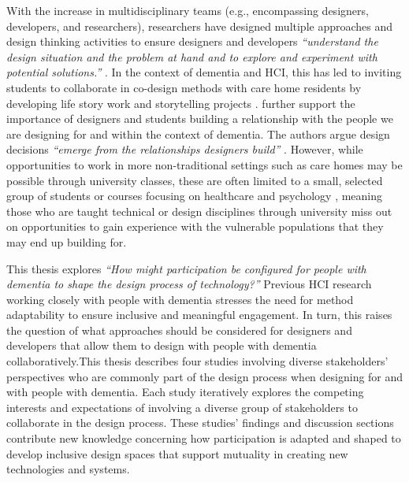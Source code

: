 With the increase in multidisciplinary teams (e.g., encompassing designers, developers, and researchers), researchers have designed multiple approaches and design thinking activities to ensure designers and developers  \textit{``understand the design situation and the problem at hand and to explore and experiment with potential solutions.''} \citep[pg. 21]{dalsgaard2017instruments}. In the context of dementia and HCI, this has led to inviting students to collaborate in co-design methods with care home residents by developing life story work \citep{foley_student_2020} and storytelling projects \citep{hannan_zeitgeist_2019}. \cite{hendriks_valuing_2018} further support the importance of designers and students building a relationship with the people we are designing for and within the context of dementia. The authors argue design decisions \textit{``emerge from the relationships designers build''} \citep[pg. 3]{hendriks_valuing_2018}. However, while opportunities to work in more non-traditional settings such as care homes may be possible through university classes, these are often limited to a small, selected group of students or courses focusing on healthcare and psychology \citep{kinnunen_understanding_2018}, meaning those who are taught technical or design disciplines through university miss out on opportunities to gain experience with the vulnerable populations that they may end up building for.

This thesis explores \textit{``How might participation be configured for people with dementia to shape the design process of technology?''} Previous HCI research working closely with people with dementia stresses the need for method adaptability to ensure inclusive and meaningful engagement. In turn, this raises the question of what approaches should be considered for designers and developers that allow them to design with people with dementia collaboratively.This thesis describes four studies involving diverse stakeholders' perspectives who are commonly part of the design process when designing for and with people with dementia. Each study iteratively explores the competing interests and expectations of involving a diverse group of stakeholders to collaborate in the design process. These studies' findings and discussion sections contribute new knowledge concerning how participation is adapted and shaped to develop inclusive design spaces that support mutuality in creating new technologies and systems.

